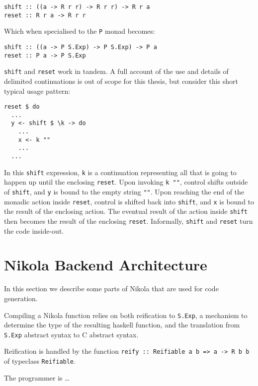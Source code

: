 \begin{verbatim}
shift :: ((a -> R r r) -> R r r) -> R r a
reset :: R r a -> R r r
\end{verbatim}

Which when specialised to the \texttt{P} monad becomes:

\begin{verbatim}
shift :: ((a -> P S.Exp) -> P S.Exp) -> P a
reset :: P a -> P S.Exp
\end{verbatim}

\texttt{shift} and \texttt{reset} work in tandem. A full account of the use and
details of delimited continuations is out of scope for this thesis, but
consider this short typical usage pattern:

\begin{verbatim}
reset $ do
  ...
  y <- shift $ \k -> do
    ...
    x <- k ""
    ...
  ...

\end{verbatim}

In this \texttt{shift} expression, \texttt{k} is a continuation representing
all that is going to happen up until the enclosing \texttt{reset}.  Upon
invoking \texttt{k ""}, control shifts outside of \texttt{shift}, and \texttt{y}
is bound to the empty string \texttt{""}. Upon reaching the end of the monadic
action inside \texttt{reset}, control is shifted back into \texttt{shift}, and
\texttt{x} is bound to the result of the enclosing action. The eventual result
of the action inside \texttt{shift} then becomes the result of the enclosing
\texttt{reset}. Informally, \texttt{shift} and \texttt{reset} turn the code
inside-out.

\section{Nikola Backend Architecture}

In this section we describe some parts of Nikola that are used for code
generation.

Compiling a Nikola function relies on both reification to \texttt{S.Exp}, a
mechanism to determine the type of the resulting haskell function, and the
translation from \texttt{S.Exp} abstract syntax to C abstract syntax.

Reification is handled by the function \texttt{reify :: Reifiable a b => a -> R
b b} of typeclass \texttt{Reifiable}.

The programmer is \ldots {}
